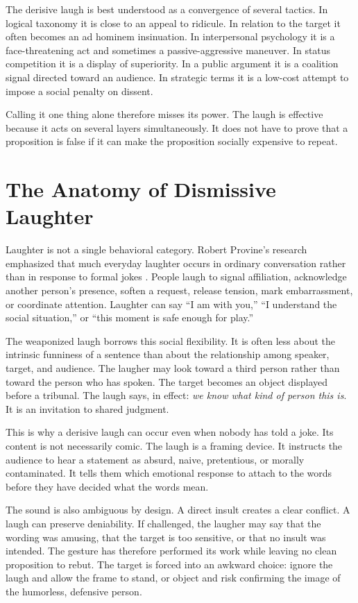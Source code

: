 ﻿\documentclass[12pt,a4paper]{book}
\begin{document}
The derisive laugh is best understood as a convergence of several tactics. In logical taxonomy it is close to an appeal to ridicule. In relation to the target it often becomes an ad hominem insinuation. In interpersonal psychology it is a face-threatening act and sometimes a passive-aggressive maneuver. In status competition it is a display of superiority. In a public argument it is a coalition signal directed toward an audience. In strategic terms it is a low-cost attempt to impose a social penalty on dissent.

Calling it one thing alone therefore misses its power. The laugh is effective because it acts on several layers simultaneously. It does not have to prove that a proposition is false if it can make the proposition socially expensive to repeat.

\section{The Anatomy of Dismissive Laughter}

Laughter is not a single behavioral category. Robert Provine's research emphasized that much everyday laughter occurs in ordinary conversation rather than in response to formal jokes \cite{provine2000}. People laugh to signal affiliation, acknowledge another person's presence, soften a request, release tension, mark embarrassment, or coordinate attention. Laughter can say ``I am with you,'' ``I understand the social situation,'' or ``this moment is safe enough for play.''

The weaponized laugh borrows this social flexibility. It is often less about the intrinsic funniness of a sentence than about the relationship among speaker, target, and audience. The laugher may look toward a third person rather than toward the person who has spoken. The target becomes an object displayed before a tribunal. The laugh says, in effect: \emph{we know what kind of person this is}. It is an invitation to shared judgment.

This is why a derisive laugh can occur even when nobody has told a joke. Its content is not necessarily comic. The laugh is a framing device. It instructs the audience to hear a statement as absurd, naive, pretentious, or morally contaminated. It tells them which emotional response to attach to the words before they have decided what the words mean.

The sound is also ambiguous by design. A direct insult creates a clear conflict. A laugh can preserve deniability. If challenged, the laugher may say that the wording was amusing, that the target is too sensitive, or that no insult was intended. The gesture has therefore performed its work while leaving no clean proposition to rebut. The target is forced into an awkward choice: ignore the laugh and allow the frame to stand, or object and risk confirming the image of the humorless, defensive person.
\end{document}
